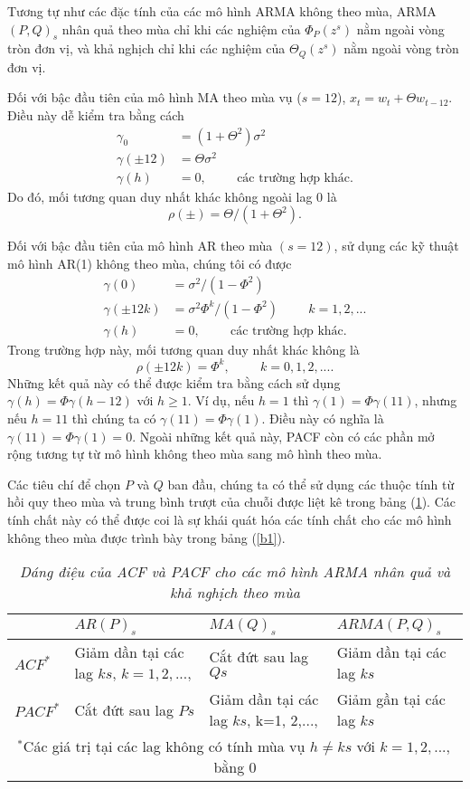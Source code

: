 \documentclass[12pt, a4paper,oneside]{book}
\theoremstyle{definition}
\begin{document}
Tương tự như các đặc tính của các mô hình ARMA không theo mùa, ARMA$(P,Q)_s$ nhân quả theo mùa chỉ khi các nghiệm của $\Phi_ {P} (z^{s})$ nằm ngoài vòng tròn đơn vị, và khả nghịch chỉ khi các nghiệm của $\varTheta_{Q}(z^{s})$ nằm ngoài vòng tròn đơn vị.

Đối với bậc đầu tiên của mô hình MA theo mùa vụ ($s=12$), $x_t=w_t+\Theta w_{t-12}$. Điều này dễ kiểm tra bằng cách
\begin{align*}
	\gamma_0 &=(1+\Theta^{2})\sigma^{2}\\
	\gamma(\pm 12) &=\Theta\sigma^{2}\\
	\gamma(h) &=0, \hspace{1cm} \text{các trường hợp khác.}
\end{align*}
Do đó, mối tương quan duy nhất khác không ngoài lag $0$ là $$\rho(\pm)=\Theta/(1+\Theta^{2}).$$

Đối với bậc đầu tiên của mô hình AR theo mùa $(s=12)$, sử dụng các kỹ thuật mô hình AR(1) không theo mùa, chúng tôi có được
\begin{align*}
	\gamma(0) &= \sigma^{2} / (1-\Phi^{2})\\
	\gamma(\pm12k) &= \sigma^{2}\Phi^{k} / (1-\Phi^{2}) \hspace{1cm} k=1, 2,...\\
	\gamma(h)&=0, \hspace{1cm} \text{các trường hợp khác.}
\end{align*}
Trong trường hợp này, mối tương quan duy nhất khác không là
$$\rho(\pm12k) =\Phi^{k}, \hspace{1cm} k=0, 1, 2,... .$$
Những kết quả này có thể được kiểm tra bằng cách sử dụng $\gamma(h)=\Phi\gamma(h-12)$ với $h\geq1$. Ví dụ, nếu $h=1$ thì $\gamma(1)=\Phi\gamma(11)$, nhưng nếu $h=11$ thì chúng ta có $\gamma(11)=\Phi\gamma(1)$. Điều này có nghĩa là $\gamma(11)=\Phi\gamma(1)=0$. Ngoài những kết quả này, PACF còn có các phần mở rộng tương tự từ mô hình không theo mùa sang mô hình theo mùa.

Các tiêu chí để chọn $P$ và $Q$ ban đầu, chúng ta có thể sử dụng các thuộc tính từ hồi quy theo mùa và trung bình trượt của chuỗi được liệt kê trong bảng ({\ref{b2}}). Các tính chất này có thể được coi là sự khái quát hóa các tính chất cho các mô hình không theo mùa được trình bày trong bảng (\ref{b1}).
\begin{table}[h!]
	\centering
	\begin{tabular}{|p{3cm}|p{4cm}|p{4cm}|p{4cm}|}
		\hline 
&$AR(P)_s$ &$MA(Q)_s$ &$ARMA(P,Q)_s$ \\
		\hline 
$ACF^{*}$ &Giảm dần tại các lag $ks$, $k=1, 2, ...,$ &Cắt đứt sau lag $Qs$ & Giảm dần tại các lag $ks$\\
		\hline 
$PACF^{*}$ &Cắt đứt sau lag $Ps$ & Giảm dần tại các lag $ks$, k=1, 2,..., & Giảm gần tại các lag $ks$ \\
		\hline 
		\multicolumn{4}{|c|}{$^{*}$Các giá trị tại các lag không có tính mùa vụ $h\neq ks$ với $k=1, 2, ...,$ bằng $0$}.\\
		\hline 
	\end{tabular}
	\caption{\textit{Dáng điệu của ACF và PACF cho các mô hình ARMA  nhân quả và khả nghịch theo mùa}}
	\label{b2} 
\end{table}
\end{document}
